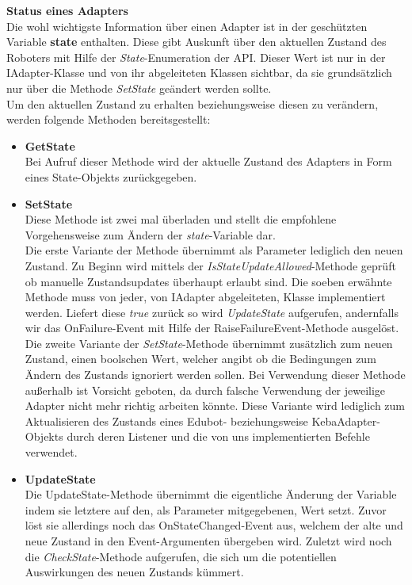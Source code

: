 \textbf{Status eines Adapters}\\
Die wohl wichtigste Information über einen Adapter ist in der geschützten Variable \textbf{state} enthalten. Diese gibt Auskunft über den aktuellen Zustand des Roboters mit Hilfe der \textit{State}-Enumeration der API. Dieser Wert ist nur in der IAdapter-Klasse und von ihr abgeleiteten Klassen sichtbar, da sie grundsätzlich nur über die Methode \textit{SetState} geändert werden sollte.\\
Um den aktuellen Zustand zu erhalten beziehungsweise diesen zu verändern, werden folgende Methoden bereitsgestellt:
\begin{itemize}
\item \textbf{GetState}\\
Bei Aufruf dieser Methode wird der aktuelle Zustand des Adapters in Form eines State-Objekts zurückgegeben.
\item \textbf{SetState}\\
Diese Methode ist zwei mal überladen und stellt die empfohlene Vorgehensweise zum Ändern der \textit{state}-Variable dar.\\
Die erste Variante der Methode übernimmt als Parameter lediglich den neuen Zustand. Zu Beginn wird mittels der \textit{IsStateUpdateAllowed}-Methode geprüft ob manuelle Zustandsupdates überhaupt erlaubt sind. Die soeben erwähnte Methode muss von jeder, von IAdapter abgeleiteten, Klasse implementiert werden. Liefert diese \textit{true} zurück so wird \textit{UpdateState} aufgerufen, andernfalls wir das OnFailure-Event mit Hilfe der RaiseFailureEvent-Methode ausgelöst.\\
Die zweite Variante der \textit{SetState}-Methode übernimmt zusätzlich zum neuen Zustand, einen boolschen Wert, welcher angibt ob die Bedingungen zum Ändern des Zustands ignoriert werden sollen. Bei Verwendung dieser Methode außerhalb ist Vorsicht geboten, da durch falsche Verwendung der jeweilige Adapter nicht mehr richtig arbeiten könnte. Diese Variante wird lediglich zum Aktualisieren des Zustands eines Edubot- beziehungsweise KebaAdapter-Objekts durch deren Listener und die von uns implementierten Befehle verwendet.
\item \textbf{UpdateState}\\
Die UpdateState-Methode übernimmt die eigentliche Änderung der Variable indem sie letztere auf den, als Parameter mitgegebenen, Wert setzt. Zuvor löst sie allerdings noch das OnStateChanged-Event aus, welchem der alte und neue Zustand in den Event-Argumenten übergeben wird. Zuletzt wird noch die \textit{CheckState}-Methode aufgerufen, die sich um die potentiellen Auswirkungen des neuen Zustands kümmert.

\end{itemize}
